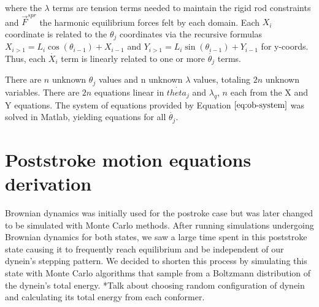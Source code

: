 \documentclass[9pt,twocolumn,twoside]{article}
\begin{document}
  where the $\lambda$ terms are tension terms needed to maintain the rigid rod constraints and $\vec{F}^{spr}$ the harmonic equilibrium forces felt by each domain. Each $X_i$ coordinate is related to the $\theta_j$ coordinates via the recursive formulas $X_{i>1} = L_i\cos(\theta_{i-1})+X_{i-1}$ and $Y_{i>1} = L_i\sin(\theta_{i-1})+Y_{i-1}$ for y-coords. Thus, each $\dot{X_i}$ term is linearly related to one or more $\dot{\theta_j}$ terms.

  There are $n$ unknown $\theta_j$ values and n unknown $\lambda$ values, totaling $2n$ unknown variables. There are $2n$ equations linear in $\dot{theta_j}$ and $\lambda_q$, $n$ each from the X and Y equations. The system of equations provided by Equation $\ref{eq:ob-system}$ was solved in Matlab, yielding equations for all $\dot{\theta_j}$.

\section*{Poststroke motion equations derivation}
Brownian dynamics was initially used for the postroke case but was later changed to be simulated with Monte Carlo methods. After running simulations undergoing Brownian dynamics for both states, we saw a large time spent in this poststroke state causing it to frequently reach equilibrium and be independent of our dynein's stepping pattern. We decided to shorten this process by simulating this state with Monte Carlo algorithms that sample from a Boltzmann distribution of the dynein's total energy. 
*Talk about choosing random configuration of dynein and calculating its total energy from each conformer. 

\end{document}
